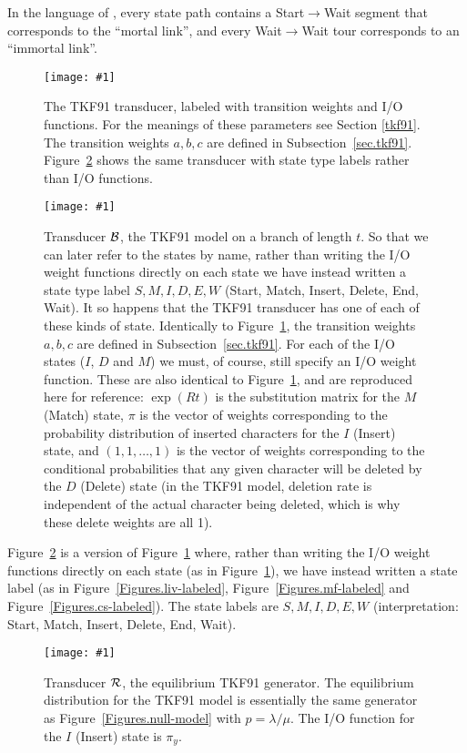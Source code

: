 \documentclass{article}
\newcommand{\secref}[1]{Subsection~\ref{sec.#1}}
\newcommand{\figref}[1]{Figure~\ref{Figures.#1}}
\newcommand{\figlabel}[1]{\label{Figures.#1}}
\newcommand{\easyfig}[4]{
\begin{figure}
\texttt{[image: \#1]}
\caption{ \figlabel{#3} #4}
\end{figure}}
\newcommand{\pdffig}[2]{\easyfig{#1-fig.pdf}{}{#1}{#2}}
\newcommand\tkf{{\cal B}}
\newcommand\tkfroot{{\cal R}}
\begin{document}
In the language of \cite{ThorneEtal91}, every state path contains a Start$\to$Wait segment that corresponds to the ``mortal link'',
and every Wait$\to$Wait tour corresponds to an ``immortal link''.

\pdffig{tkf91}{The TKF91 transducer, labeled with transition weights and I/O functions.  
For the meanings of these parameters see Section \ref{tkf91}. 
The transition weights $a,b,c$ are defined in \secref{tkf91}.
\figref{tkf91-labeled} shows the same transducer with state type labels rather than I/O functions. }



\pdffig{tkf91-labeled}{
Transducer $\tkf$, the TKF91 model on a branch of length $t$.
So that we can later refer to the states by name,
rather than writing the I/O weight functions directly on each state
we have instead written a state type label
 $S,M,I,D,E,W$ (Start, Match, Insert, Delete, End, Wait).
It so happens that the TKF91 transducer has one of each of these kinds of state.
Identically to \figref{tkf91}, the transition weights $a,b,c$ are defined in \secref{tkf91}.
For each of the I/O states ($I$, $D$ and $M$) we must, of course, still specify an I/O weight function.
These are also identical to \figref{tkf91}, and are reproduced here for reference:
 $\exp(Rt)$ is the substitution matrix for the $M$ (Match) state,
 $\pi$ is the vector of weights
  corresponding to the probability distribution of inserted characters for the $I$ (Insert) state,
 and
 $(1,1,\ldots,1)$
 is the vector of weights corresponding to
 the conditional probabilities that any given character will be deleted by the $D$ (Delete) state
 (in the TKF91 model, deletion rate is independent of the actual character being deleted,
 which is why these delete weights are all 1).
}

\figref{tkf91-labeled} is a version of \figref{tkf91}
where, rather than writing the I/O weight functions directly on each state (as in \figref{tkf91}),
we have instead written a state label (as in \figref{liv-labeled}, \figref{mf-labeled} and \figref{cs-labeled}).
The state labels are $S,M,I,D,E,W$ (interpretation: Start, Match, Insert, Delete, End, Wait).

\pdffig{tkf91-root}{Transducer $\tkfroot$, the equilibrium TKF91 generator.
The equilibrium distribution for the TKF91 model is essentially the same generator as \figref{null-model} with $p=\lambda/\mu$.
The I/O function for the $I$ (Insert) state is $\pi_y$.}
\end{document}
